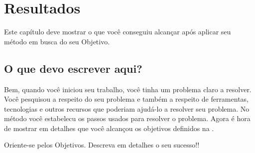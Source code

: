 \chapter{Resultados}
\label{Resultados}

Este capítulo deve mostrar o que você conseguiu alcançar após aplicar seu método em busca do seu Objetivo.

\section{O que devo escrever aqui?}
Bem, quando você iniciou seu trabalho, você tinha um problema claro a resolver.
Você pesquisou a respeito do seu problema e também a respeito de ferramentas, tecnologias e outros recursos que poderiam ajudá-lo a resolver seu problema. No método você estabelecu os passos usados para resolver o problema. Agora é hora de mostrar em detalhes que você alcançou os objetivos definidos na .

Oriente-se pelos Objetivos. Descreva em detalhes o seu sucesso!!